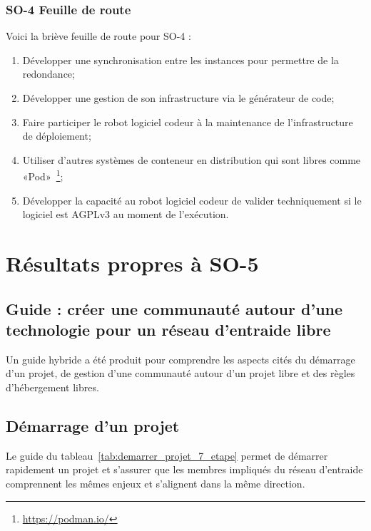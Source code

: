 \subsubsection{SO-4 Feuille de route}
Voici la briève feuille de route pour SO-4 :
\begin{enumerate}
    \item Développer une synchronisation entre les instances pour permettre de la redondance;
    \item Développer une gestion de son infrastructure via le générateur de code;
    \item Faire participer le robot logiciel codeur à la maintenance de l’infrastructure de déploiement;
    \item Utiliser d’autres systèmes de conteneur en distribution qui sont libres comme «Pod»~\footnote{\url{https://podman.io/}};
    \item Développer la capacité au robot logiciel codeur de valider techniquement si le logiciel est AGPLv3 au moment de l’exécution.
\end{enumerate}

\section{Résultats propres à SO-5}

\subsection{Guide : créer une communauté autour d’une technologie pour un réseau d’entraide libre}

Un guide hybride a été produit pour comprendre les aspects cités du démarrage d’un projet, de gestion d’une communauté autour d’un projet libre et des règles d'hébergement libres.

\subsection{Démarrage d’un projet}

Le guide du tableau~\ref{tab:demarrer_projet_7_etape} permet de démarrer rapidement un projet et s'assurer que les membres impliqués du réseau d'entraide comprennent les mêmes enjeux et s'alignent dans la même direction.


